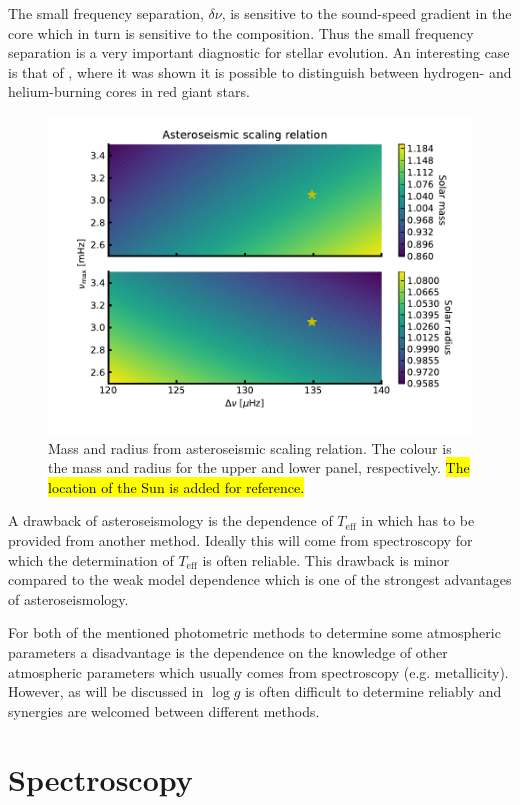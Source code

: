 The small frequency separation, $\delta\nu$, is sensitive to the sound-speed gradient in the core
which in turn is sensitive to the composition. Thus the small frequency separation is a very
important diagnostic for stellar evolution. An interesting case is that of \citet{Bedding2011},
where it was shown it is possible to distinguish between hydrogen- and helium-burning cores in red
giant stars.

\begin{figure}[htpb!]
    \centering
    \includegraphics[width=0.85\linewidth]{figures/scaling_relation.pdf}
    \caption{Mass and radius from asteroseismic scaling relation. The colour is the mass and radius
             for the upper and lower panel, respectively. \hl{The location of the Sun is added for
             reference.}}
    \label{fig:scaling}
\end{figure}

A drawback of asteroseismology is the dependence of $T_\mathrm{eff}$ in  which has
to be provided from another method. Ideally this will come from spectroscopy for which the
determination of $T_\mathrm{eff}$ is often reliable. This drawback is minor compared to the weak
model dependence which is one of the strongest advantages of asteroseismology.

For both of the mentioned photometric methods to determine some atmospheric parameters a
disadvantage is the dependence on the knowledge of other atmospheric parameters which usually comes
from spectroscopy (e.g. metallicity). However, as will be discussed in
 $\log g$ is often difficult to determine reliably and synergies are
welcomed between different methods.

\section{Spectroscopy}
\label{sec:method_spectroscopy}

